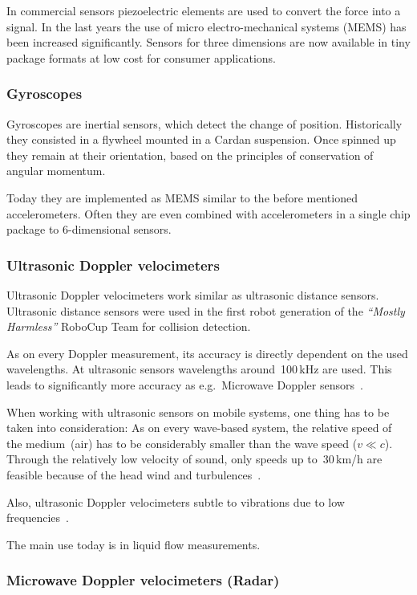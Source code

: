 \documentclass[12pt,a4paper]{article}
\newcommand{\MH}{\emph{``Mostly Harmless''} RoboCup Team\xspace}
\begin{document}
In commercial sensors piezoelectric elements are used to convert the force into a signal.
In the last years the use of micro electro-mechanical systems (MEMS) has been increased significantly.
Sensors for three dimensions are now available in tiny package formats at low cost for consumer applications.

\subsubsection{Gyroscopes}

Gyroscopes are inertial sensors, which detect the change of position.
Historically they consisted in a flywheel mounted in a Cardan suspension.
Once spinned up they remain at their orientation, based on the principles of conservation of angular momentum.

Today they are implemented as MEMS similar to  the before mentioned accelerometers.
Often they are even combined with accelerometers in a single chip package to 6-dimensional sensors.


\subsubsection{Ultrasonic Doppler velocimeters}

Ultrasonic Doppler velocimeters work similar as ultrasonic distance sensors.
Ultrasonic distance sensors were used in the first robot generation of the \MH for collision detection.

As on every Doppler measurement, its accuracy is directly dependent on the used wavelengths.
At ultrasonic sensors wavelengths around~100\,kHz are used. 
This leads to significantly more accuracy as e.g.\ Microwave Doppler sensors~\cite{ultrasonic}.

When working with ultrasonic sensors on mobile systems, one thing has to be taken into consideration: 
As on every wave-based system, the relative speed of the medium~(air) has to be considerably smaller than the wave speed ($v \ll c$).
Through the relatively low velocity of sound, only speeds up to~30\,km/h are feasible because of the head wind and turbulences~\cite{ultrasonic}.

Also, ultrasonic Doppler velocimeters subtle to vibrations due to low frequencies~\cite{agri}.

The main use today is in liquid flow measurements.



\subsubsection{Microwave Doppler velocimeters (Radar)}
\end{document}
